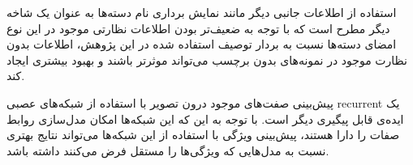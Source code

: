 استفاده از اطلاعات جانبی دیگر مانند نمایش برداری نام دسته‌ها به عنوان یک شاخه دیگر مطرح است که با توجه به ضعیف‌تر بودن اطلاعات نظارتی موجود در این نوع امضای  دسته‌ها نسبت به بردار توصیف استفاده شده در این پژوهش، اطلاعات بدون نظارت موجود در نمونه‌های بدون برچسب  می‌تواند موثرتر باشند و بهبود بیشتری ایجاد کند.

پیش‌بینی صفت‌های موجود درون تصویر با استفاده از شبکه‌های عصبی \gls{recurrent} یک ایده‌ی قابل پیگیری دیگر است. با توجه به این که این شبکه‌ها امکان مدل‌سازی روابط صفات را دارا هستند، پیش‌بینی ویژگی با استفاده از این شبکه‌ها می‌تواند نتایج بهتری نسبت به مدل‌هایی که ویژگی‌ها را مستقل فرض می‌کنند داشته باشد. 
